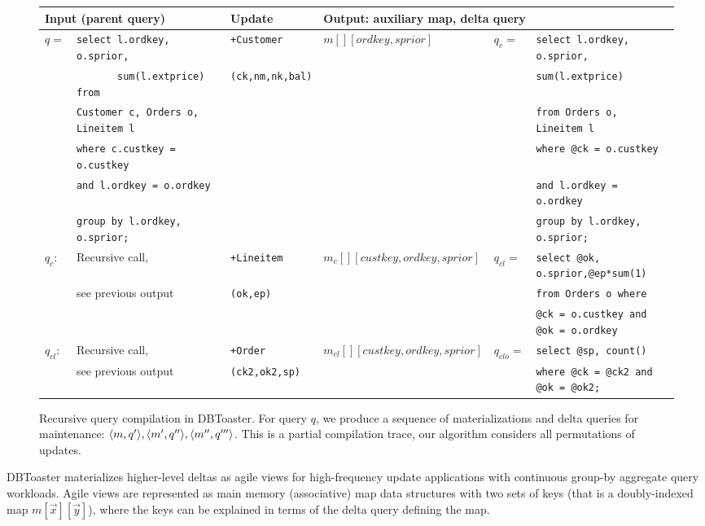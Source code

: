 \def \sql#1{{\scriptsize {\tt #1}}}
\begin{figure*}[htbp]

\vspace{-8mm}

\hspace{-3mm}\begin{tabular}{ll|l|l|ll}
\multicolumn{2}{l}{Input (parent query)}
& Update 
& \multicolumn{3}{l}{Output: auxiliary map, delta query}
\\
\hline
$q =$
& \sql{select l.ordkey, o.sprior,}
& \texttt{+Customer}
& $m[][ordkey,sprior]$
& $q_c =$
& \sql{select l.ordkey, o.sprior,}
\\
& \sql{\ \ \ \ \ \ \ sum(l.extprice) from}
& \texttt{(ck,nm,nk,bal)}
& & & \sql{sum(l.extprice)}
\\
& \sql{Customer c, Orders o, Lineitem l}
& & & & \sql{from Orders o, Lineitem l}
\\
& \sql{where c.custkey = o.custkey}
& & & & \sql{where @ck = o.custkey} 
\\
& \sql{and l.ordkey = o.ordkey}
& & & & \sql{and l.ordkey = o.ordkey}
\\
& \sql{group by l.ordkey, o.sprior;}
& & & & \sql{group by l.ordkey, o.sprior;}
\\
\hline
$q_c$:
& Recursive call,
& \texttt{+Lineitem} 
& $m_c[][custkey,ordkey,sprior]$
& $q_{cl} =$ & \sql{select @ok, o.sprior,@ep*sum(1)}
\\
& see previous output
& \texttt{(ok,ep)} & & & \sql{from Orders o where}
\\
& & & & & \sql{@ck = o.custkey and @ok = o.ordkey}
\\
\hline
$q_{cl}$:
& Recursive call,
& \texttt{+Order} 
& $m_{cl}[][custkey,ordkey,sprior]$
& $q_{clo}=$ & \sql{select @sp, count()}
\\
& see previous output
& \texttt{(ck2,ok2,sp)}
& & & \sql{where @ck = @ck2 and @ok = @ok2;}
\end{tabular}
\caption{Recursive query compilation in DBToaster. For query $q$, we produce a
sequence of materializations and delta queries for maintenance: ${\langle m,q'\rangle},
{\langle m',q''\rangle}, {\langle m'',q'''\rangle}$. This is a partial compilation trace, our
algorithm considers all permutations of updates.}
\label{fig:compex}
\vspace{-4mm}
\end{figure*}

DBToaster materializes higher-level deltas as agile views for high-frequency
update applications with continuous group-by aggregate query workloads. Agile
views are represented as main memory (associative) map data structures with two
sets of keys (that is a doubly-indexed map $m[\vec{x}][\vec{y}]$), where the
keys can be explained in terms of the delta query defining the map.

